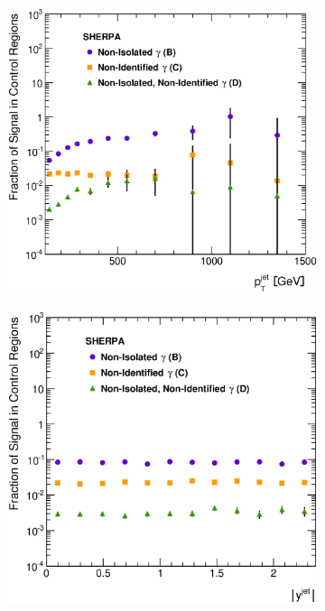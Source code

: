 \documentclass[12pt, twoside]{article}
\numberwithin{equation}{section}
\numberwithin{figure}{section}
\newenvironment{changemargin}[2]{%
\begin{list}{}{%
\setlength{\topsep}{0pt}%
\setlength{\leftmargin}{#1}%
\setlength{\rightmargin}{#2}%
\setlength{\listparindent}{\parindent}%
\setlength{\itemindent}{\parindent}%
\setlength{\parsep}{\parskip}%
}%
\item[]}{\end{list}}
\begin{document}
\begin{figure}
\begin{changemargin}{-1.0cm}{-0.75cm}
\begin{changemargin}{-0.75cm}{-1.0cm}
        \vspace{0.2cm}
        \begin{subfigure}[b]{0.37\textwidth}
            \includegraphics[width=\textwidth]{./images/SignalLeakageFractionsSherpa/SLF-104.eps}
            \subcaption{}
            \label{fig:SLFPtJet}
        \end{subfigure}
        \begin{subfigure}[b]{0.37\textwidth}
            \includegraphics[width=\textwidth]{./images/SignalLeakageFractionsSherpa/SLF-105.eps}

\end{subfigure}
\end{changemargin}
\end{changemargin}
\end{figure}
\end{document}
